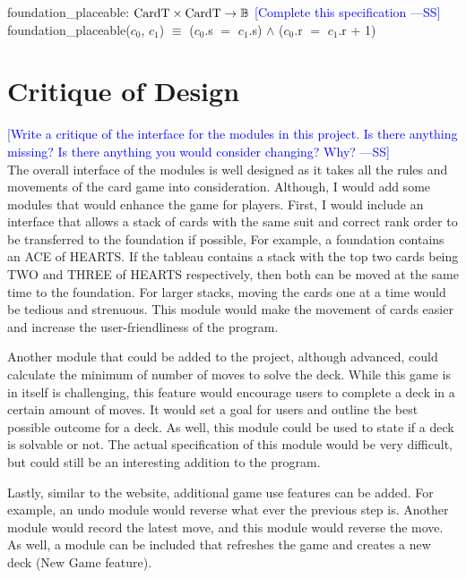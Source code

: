\documentclass[12pt]{article}
\newcommand{\authornote}[3]{\textcolor{#1}{[#3 ---#2]}}
\newcommand{\authornote}[3]{}
\newcommand{\wss}[1]{\authornote{blue}{SS}{#1}}
\begin{document}
\noindent foundation\_placeable: $\text{CardT} \times \text{CardT} \rightarrow \mathbb{B} \\ $ \wss{Complete this specification}
\noindent foundation\_placeable($c_0$, $c_1$) $\equiv$ ($c_0$.s $=$ $c_1$.s) $\land$ ($c_0$.r $= $ $c_1$.r + 1)
\newpage

\section*{Critique of Design}

\wss{Write a critique of the interface for the modules in this project.  Is there
anything missing?  Is there anything you would consider changing?  Why?}\\

The overall interface of the modules is well designed as it takes all the rules and movements of the card game into consideration. Although, I would add some modules that would enhance the game for players. First, I would include an interface that allows a stack of cards with the same suit and correct rank order to be transferred to the foundation if possible, For example, a foundation contains an ACE of HEARTS. If the tableau contains a stack with the top two cards being TWO and THREE of HEARTS respectively, then both can be moved at the same time to the foundation. For larger stacks, moving the cards one at a time would be tedious and strenuous. This module would make the movement of cards easier and increase the user-friendliness of the program. 

Another module that could be added to the project, although advanced, could calculate the minimum of number of moves to solve the deck. While this game is in itself is challenging, this feature would encourage users to complete a deck in a certain amount of moves. It would set a goal for users and outline the best possible outcome for a deck. As well, this module could be used to state if a deck is solvable or not. The actual specification of this module would be very difficult, but could still be an interesting addition to the program. 

Lastly, similar to the website, additional game use features can be added. For example, an undo module would reverse what ever the previous step is. Another module would record the latest move, and this module would reverse the move. As well, a module can be included that refreshes the game and creates a new deck (New Game feature). 
\end{document}
